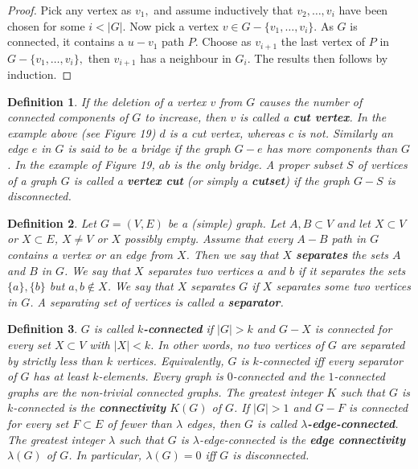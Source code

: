 \documentclass[12pt,a4paper]{article}
\newtheorem{defn}{Definition}[section]
\theoremstyle{definition}
\begin{document}
\begin{proof}
Pick any vertex as $v_1,$ and assume inductively that $v_2, \dots ,  v_i$ have been chosen for some $i < |G|$. Now pick a vertex $v \in G- \{ v_1, \dots ,  v_i\}.$ As $G$ is connected, it contains a $u-v_1$ path $P$. Choose as $v_{i+1}$ the last vertex of $P$ in $G-\{v_1, \dots , v_i\},$ then $v_{i+1}$ has a neighbour in $G_i$. The results then follows by induction. 
\end{proof}
\begin{defn}If the deletion of a vertex $v$ from $G$ causes the number of connected components of $G$ to increase, then $v$ is called a \textbf{cut vertex}. In the example above (see Figure 19) $d$ is a cut vertex, whereas $c$ is not. Similarly an edge $e$ in $G$ is said to be a bridge if the graph $G-e$ has more components than $G$. In the example of Figure 19, $ab$ is the only bridge. A proper subset $S$ of vertices of a graph $G$ is called a \textbf{vertex cut} (or simply a \textbf{cutset}) if the graph $G-S$ is disconnected. 
\end{defn}
\begin{defn} Let $G=(V,E)$ be a (simple) graph. Let $A,B \subset V$ and let $X \subset V$ or $X \subset E $, $X \neq V$ or $X$ possibly empty. Assume that every $A-B$ path in $G$ contains a vertex or an edge from $X$. Then we say that $X$ \textbf{separates} the sets $A$ and $B$ in $G$. We say that $X$ separates two vertices $a$ and $b$ if it separates the sets $\{a\}, \{b\}$ but $a,b \notin X$. We say that $X$ separates $G$ if $X$ separates some two vertices in $G$. A separating set of vertices is called a \textbf{separator}.
\end{defn}
\newpage
\begin{defn} $G$ is called \textbf{$k$-connected} if $|G|>k$ and $G-X$ is connected for every set $X \subset V$ with $|X| <k$. In other words, no two vertices of $G$ are separated by strictly less than $k$ vertices. Equivalently, $G$ is $k$-connected iff every separator of $G$ has at least $k$-elements. Every graph is $0$-connected and the $1$-connected graphs are the non-trivial connected graphs. The greatest integer $K$ such that $G$ is $k$-connected is the \textbf{connectivity} $K(G)$ of $G$. If $|G| >1$ and $G-F$ is connected for every set $F \subset E$ of fewer than $\lambda$ edges, then $G$ is called \textbf{$\lambda$-edge-connected}. The greatest integer $\lambda$ such that $G$ is $\lambda$-edge-connected is the \textbf{edge connectivity} $\lambda(G)$ of $G$. In particular, $\lambda (G)=0$ iff $G$ is disconnected.
\end{defn}
\end{document}
